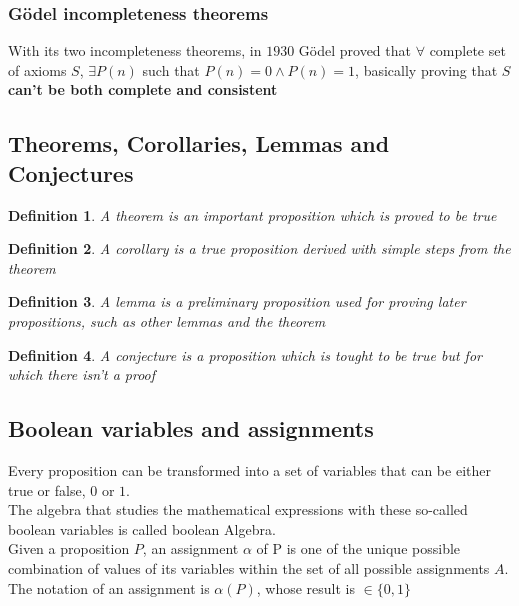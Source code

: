 \documentclass{report}
\newtheorem{definition}{Definition}[section]
\begin{document}
            \subsubsection{Gödel incompleteness theorems}
                With its two incompleteness theorems, in $1930$ Gödel proved 
                that $\forall$ complete set of axioms $S$, $\exists P\left(n\right)$ such that 
                $P\left(n\right) = 0 \land P\left(n\right) = 1$, basically proving 
                that $S$ \textbf{can't be both complete and consistent}
        \subsection{Theorems, Corollaries, Lemmas and Conjectures}
            \begin{definition}
                A theorem is an important proposition which is proved to be true
            \end{definition}
            \begin{definition}
                A corollary is a true proposition derived with simple steps from the theorem
            \end{definition}
            \begin{definition}
                A lemma is a preliminary proposition used for proving later propositions, 
                such as other lemmas and the theorem 
            \end{definition}
            \begin{definition}
                A conjecture is a proposition which is tought to be true but 
                for which there isn't a proof
            \end{definition}
        \subsection{Boolean variables and assignments}
            Every proposition can be transformed into a set of variables that 
            can be either true or false, $0$ or $1$. \\
            The algebra that studies the mathematical expressions with these so-called 
            boolean variables is called boolean Algebra. \\
            Given a proposition $P$, an assignment $\alpha$ of P is one of 
            the unique possible combination of values of its variables within
            the set of all possible assignments $A$. The notation of an assignment 
            is $\alpha\left(P\right)$, whose result is $\in \{0, 1\}$
\end{document}
